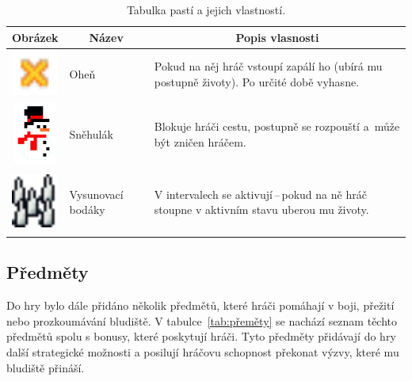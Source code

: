 \vline

\begin{table}[H]
    \centering
    \begin{tabular}{|m{2cm}|m{2cm}|m{8cm}|}
    \hline
    \multicolumn{1}{|c|}{\textbf{Obrázek}} & \multicolumn{1}{c|}{\textbf{Název}} & \multicolumn{1}{c|}{\textbf{Popis vlasnosti}} \\
    \hline
    \hline
    \centering\includegraphics[width=1.5cm,height=1.5cm]{obrazky-figures/ch3/fire.png} & Oheň & Pokud na něj hráč vstoupí zapálí ho (ubírá mu postupně životy). Po určité době vyhasne. \\
    \hline
    \centering\includegraphics[width=1.5cm,height=2cm]{obrazky-figures/ch3/snowman.png} & Sněhulák & Blokuje hráči cestu, postupně se rozpouští a~může být zničen hráčem. \\
    \hline
    \centering\includegraphics[width=1.5cm,height=2cm]{obrazky-figures/ch3/trap.png} & Vysunovací bodáky & V intervalech se aktivují\,--\,pokud na ně hráč stoupne v aktivním stavu uberou mu životy. \\
    \hline
    \end{tabular}
    \caption{Tabulka pastí a jejich vlastností.}
    \label{tab:pasti}
\end{table}

\subsection*{Předměty}
Do hry bylo dále přidáno několik předmětů, které hráči pomáhají v boji, přežití nebo prozkoumávání bludiště. V tabulce~\ref{tab:přeměty} se nachází seznam těchto předmětů spolu s bonusy, které poskytují hráči. Tyto předměty přidávají do hry další strategické možnosti a posilují hráčovu schopnost překonat výzvy, které mu bludiště přináší.

